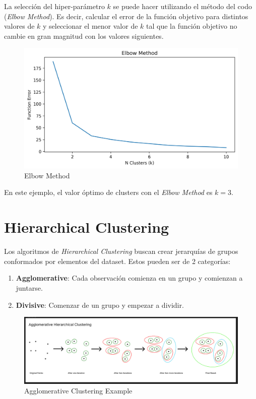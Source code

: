 La selección del hiper-parámetro $k$ se puede hacer utilizando el método del codo (\textit{Elbow Method}). Es decir, calcular el error de la función objetivo para distintos valores de $k$ y seleccionar el menor valor de $k$ tal que la función objetivo no cambie en gran magnitud con los valores siguientes. 

\begin{figure}[H]
    \center
    \includegraphics[scale=0.45]{notebooks/ML/img/elbow_method_k_means.png}
    \caption{Elbow Method}
\end{figure}

En este ejemplo, el valor óptimo de clusters con el \textit{Elbow Method} es $k=3$.  

\section{Hierarchical Clustering}

Los algoritmos de \textit{Hierarchical Clustering} buscan crear jerarquías de grupos conformados por elementos del dataset. Estos pueden ser de 2 categorías: 

\begin{enumerate}
    \item \textbf{Agglomerative}: Cada observación comienza en un grupo y comienzan a juntarse. 
    \item \textbf{Divisive}: Comenzar de un grupo y empezar a dividir.
\end{enumerate}

\begin{figure}[H]
    \center
    \includegraphics[scale=0.25]{notebooks/ML/img/agg_clustering.png}
    \caption{Agglomerative Clustering Example}
\end{figure}

